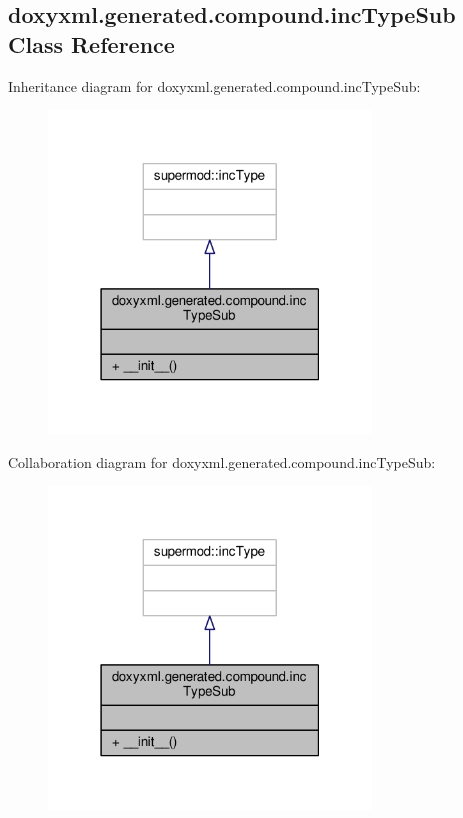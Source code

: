 \subsection{doxyxml.\+generated.\+compound.\+inc\+Type\+Sub Class Reference}
\label{classdoxyxml_1_1generated_1_1compound_1_1incTypeSub}


Inheritance diagram for doxyxml.\+generated.\+compound.\+inc\+Type\+Sub\+:
\nopagebreak
\begin{figure}[H]
\begin{center}
\leavevmode
\includegraphics[width=243pt]{df/d9f/classdoxyxml_1_1generated_1_1compound_1_1incTypeSub__inherit__graph}
\end{center}
\end{figure}


Collaboration diagram for doxyxml.\+generated.\+compound.\+inc\+Type\+Sub\+:
\nopagebreak
\begin{figure}[H]
\begin{center}
\leavevmode
\includegraphics[width=243pt]{d9/d14/classdoxyxml_1_1generated_1_1compound_1_1incTypeSub__coll__graph}
\end{center}
\end{figure}

